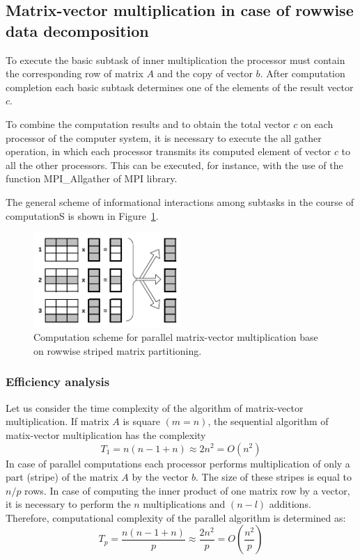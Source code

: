 \subsection{Matrix-vector multiplication in case of rowwise data decomposition} %
\label{sub:matrix_vector_multiplication_in_case_of_rowwise_data_decomposition}
To execute the basic subtask of inner multiplication the processor must contain the corresponding row of matrix $A$ and the copy of vector $b$. After computation completion each basic subtask determines one of the elements of the result vector $c$.

To combine the computation results and to obtain the total vector $c$ on each processor of the computer system, it is necessary to execute the all gather operation, in which each processor transmits its computed element of vector $c$ to all the other processors. This can be executed, for instance, with the use of the function MPI\_Allgather of MPI library.

The general scheme of informational interactions among subtasks in the course of computationS is shown in Figure~\ref{fig:rowwise-scheme}.

\begin{figure}[htbp]
  \centering
  \includegraphics[width=0.5\textwidth]{illustrations/matrix-vector-product/rowwise.png}
  \caption{Computation scheme for parallel matrix-vector multiplication base on rowwise striped matrix partitioning.}
  \label{fig:rowwise-scheme}
\end{figure}


\subsubsection{Efficiency analysis} %
\label{ssub:efficienct_analysis}
Let us consider the time complexity of the algorithm of matrix-vector multiplication. If matrix $A$ is square $(m=n)$, the sequential algorithm of matix-vector multiplication has the complexity
\begin{equation}
  T_1 = n(n-1+n)\approx 2n^2 = O(n^2)
\end{equation}
In case of parallel computations each processor performs multiplication of only a part (stripe) of the matrix $A$ by the vector $b$. The size of these stripes is equal to $n/p$ rows. In case of computing the inner product of one matrix row by a vector, it is necessary to perform the $n$ multiplications and $(n-l)$ additions. Therefore, computational complexity of the parallel algorithm is determined as:
\begin{equation}
  T_p = \frac{n(n-1+n)}{p} \approx \frac{2n^2}{p} = O(\frac{n^2}{p})
\end{equation}

